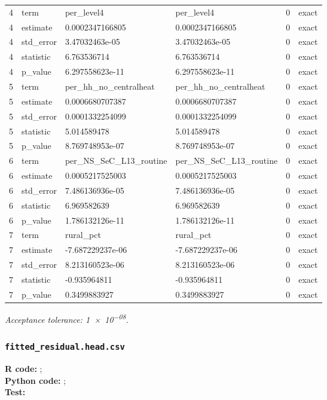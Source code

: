 \documentclass[10pt]{article}
\begin{document}
\begin{longtable}{@{}r p{}p{}p{}rl@{}}
4 & term & per\_\allowbreak{}level4 & per\_\allowbreak{}level4 & 0 & exact \\
4 & estimate & 0.0002347166805 & 0.0002347166805 & 0 & exact \\
4 & std\_\allowbreak{}error & 3.47032463e-05 & 3.47032463e-05 & 0 & exact \\
4 & statistic & 6.763536714 & 6.763536714 & 0 & exact \\
4 & p\_\allowbreak{}value & 6.297558623e-11 & 6.297558623e-11 & 0 & exact \\
5 & term & per\_\allowbreak{}hh\_\allowbreak{}no\_\allowbreak{}centralheat & per\_\allowbreak{}hh\_\allowbreak{}no\_\allowbreak{}centralheat & 0 & exact \\
5 & estimate & 0.0006680707387 & 0.0006680707387 & 0 & exact \\
5 & std\_\allowbreak{}error & 0.0001332254099 & 0.0001332254099 & 0 & exact \\
5 & statistic & 5.014589478 & 5.014589478 & 0 & exact \\
5 & p\_\allowbreak{}value & 8.769748953e-07 & 8.769748953e-07 & 0 & exact \\
6 & term & per\_\allowbreak{}NS\_\allowbreak{}SeC\_\allowbreak{}L13\_\allowbreak{}routine & per\_\allowbreak{}NS\_\allowbreak{}SeC\_\allowbreak{}L13\_\allowbreak{}routine & 0 & exact \\
6 & estimate & 0.0005217525003 & 0.0005217525003 & 0 & exact \\
6 & std\_\allowbreak{}error & 7.486136936e-05 & 7.486136936e-05 & 0 & exact \\
6 & statistic & 6.969582639 & 6.969582639 & 0 & exact \\
6 & p\_\allowbreak{}value & 1.786132126e-11 & 1.786132126e-11 & 0 & exact \\
7 & term & rural\_\allowbreak{}pct & rural\_\allowbreak{}pct & 0 & exact \\
7 & estimate & -7.687229237e-06 & -7.687229237e-06 & 0 & exact \\
7 & std\_\allowbreak{}error & 8.213160523e-06 & 8.213160523e-06 & 0 & exact \\
7 & statistic & -0.935964811 & -0.935964811 & 0 & exact \\
7 & p\_\allowbreak{}value & 0.3499883927 & 0.3499883927 & 0 & exact \\
\bottomrule
\end{longtable}
\normalsize
\textit{Acceptance tolerance: \num{1e-08}.}

\subsubsection{\texorpdfstring{\texttt{fitted\_residual.head.csv}}{fitted\_residual.head.csv}}
{\footnotesize \textbf{R code:} ; \\ \textbf{Python code:} ; \\ \textbf{Test:} \par}
\end{document}
